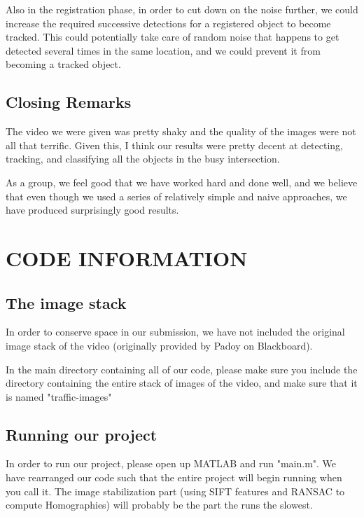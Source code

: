 \documentclass[a4paper, 10pt, conference]{ieeeconf}      %
\begin{document}
Also in the registration phase, in order to cut down on the noise further, we could increase the required successive detections for a registered object to become tracked. This could potentially take care of random noise that happens to get detected several times in the same location, and we could prevent it from becoming a tracked object. 

\subsection{Closing Remarks}
The video we were given was pretty shaky and the quality of the images were not all that terrific. Given this, I think our results were pretty decent at detecting, tracking, and classifying all the objects in the busy intersection. \newline

As a group, we feel good that we have worked hard and done well, and we believe that even though we used a series of relatively simple and naive approaches, we have produced surprisingly good results.

\newpage

\section{CODE INFORMATION}

\subsection{The image stack}
In order to conserve space in our submission, we have not included the original image stack of the video (originally provided by Padoy on Blackboard). \newline

In the main directory containing all of our code, please make sure you include the directory containing the entire stack of images of the video, and make sure that it is named "traffic-images" \newline

\subsection{Running our project}
In order to run our project, please open up MATLAB and run "main.m". We have rearranged our code such that the entire project will begin running when you call it. The image stabilization part (using SIFT features and RANSAC to compute Homographies) will probably be the part the runs the slowest. \newline
\end{document}
